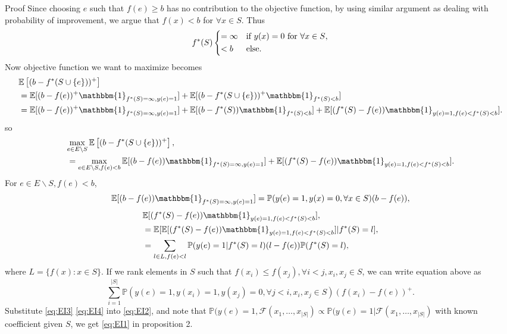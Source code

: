 \documentclass[opre,nonblindrev]{informs3} %
\newcommand{\E}{\mathbb{E}}
\begin{document}
\begin{APPENDIX}{Proof}
Since choosing $e$ such that $f(e) \geq b$ has no contribution to the objective function, by using similar argument as dealing with probability of improvement, we argue that $f(x)<b$ for $\forall x \in S$. Thus
\begin{equation*}
f^*(S)  \begin{dcases}
         =\infty & \text{if $y(x)=0$ for $\forall x \in S$},\\
         < b & \text{else}.
 \end{dcases}
\end{equation*}
Now objective function we want to maximize becomes
\begin{equation*}
  \begin{split}
    &\E \left[ (b-f^*(S \cup \{e\}))^+ \right] \\
    &= \E[(b-f(e))^+ \mathbbm{1}_{f^*(S)=\infty, y(e)=1}]+ \E[ (b-f^*(S \cup \{e\}))^+ \mathbbm{1}_{f^*(S)<b}] \\
    &= \E[(b-f(e))^+ \mathbbm{1}_{f^*(S)=\infty, y(e)=1}]+ \E[ (b-f^*(S)) \mathbbm{1}_{f^*(S)<b}] + \E[(f^*(S)-f(e)) \mathbbm{1}_{y(e)=1, f(e)<f^*(S)<b}].
  \end{split}
\end{equation*}
so
\begin{equation} \label{eq:EI2}
  \begin{split}
    &\underset{e \in E \backslash S}{\max} \, \E \left[ (b-f^*(S \cup \{e\}))^+ \right], \\
    &= \underset{e \in E \backslash S, f(e)<b}{\max} \, \E[(b-f(e)) \mathbbm{1}_{f^*(S)=\infty, y(e)=1}]+\E[(f^*(S)-f(e)) \mathbbm{1}_{y(e)=1, f(e)<f^*(S)<b}].
  \end{split}
\end{equation}
For $e \in E \backslash S, f(e)<b$,
\begin{equation}
    \E[(b-f(e)) \mathbbm{1}_{f^*(S)=\infty, y(e)=1}] = \mathbb{P}(y(e)=1, y(x)=0, \forall x \in S)(b-f(e)), 
  \label{eq:EI3}
\end{equation}
\begin{equation*}
  \begin{split}
    &\E[(f^*(S)-f(e)) \mathbbm{1}_{y(e)=1, f(e)<f^*(S)<b}], \\
    &=\E[\E[(f^*(S)-f(e)) \mathbbm{1}_{y(e)=1, f(e)<f^*(S)<b}]|f^*(S)=l], \\
    &= \sum_{l \in L, f(e)<l} \mathbb{P}(y(e)=1|f^*(S)=l)(l-f(e))\mathbb{P}(f^*(S)=l),\\
  \end{split}
\end{equation*}
where $L = \{f(x): x \in S\}$. If we rank elements in $S$ such that $f(x_i) \leq f(x_j), \forall i<j, x_i,x_j \in S$, we can write equation above as
\begin{equation}
  \sum_{i=1}^{|S|} \mathbb{P}(y(e)=1, y(x_i)=1, y(x_j)=0, \forall j<i, x_i,x_j \in S)(f(x_i)-f(e))^+.
  \label{eq:EI4}
\end{equation}
Substitute \eqref{eq:EI3} \eqref{eq:EI4} into \eqref{eq:EI2}, and note that $\mathbb{P}(y(e)=1, \mathcal{F}(x_1,\ldots,x_{|S|}) \propto \mathbb{P}(y(e)=1| \mathcal{F}(x_1,\ldots,x_{|S|})$ with known coefficient given $S$, we get \eqref{eq:EI1} in proposition 2. \Halmos
\endproof
\end{APPENDIX}
\end{document}
